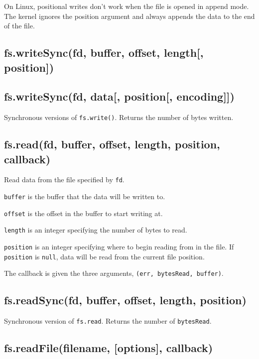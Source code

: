 On Linux, positional writes don't work when the file is opened in append
mode. The kernel ignores the position argument and always appends the
data to the end of the file.

\subsection{fs.writeSync(fd, buffer, offset, length{[},
position{]})}\label{fs.writesyncfd-buffer-offset-length-position}

\subsection{fs.writeSync(fd, data{[}, position{[},
encoding{]}{]})}\label{fs.writesyncfd-data-position-encoding}

Synchronous versions of \texttt{fs.write()}. Returns the number of bytes
written.

\subsection{fs.read(fd, buffer, offset, length, position,
callback)}\label{fs.readfd-buffer-offset-length-position-callback}

Read data from the file specified by \texttt{fd}.

\texttt{buffer} is the buffer that the data will be written to.

\texttt{offset} is the offset in the buffer to start writing at.

\texttt{length} is an integer specifying the number of bytes to read.

\texttt{position} is an integer specifying where to begin reading from
in the file. If \texttt{position} is \texttt{null}, data will be read
from the current file position.

The callback is given the three arguments,
\texttt{(err, bytesRead, buffer)}.

\subsection{fs.readSync(fd, buffer, offset, length,
position)}\label{fs.readsyncfd-buffer-offset-length-position}

Synchronous version of \texttt{fs.read}. Returns the number of
\texttt{bytesRead}.

\subsection{fs.readFile(filename, {[}options{]},
callback)}\label{fs.readfilefilename-options-callback}

